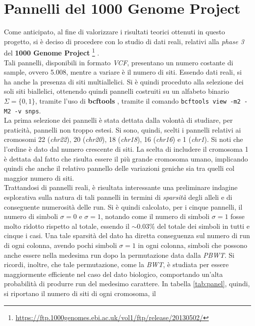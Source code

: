 \section{Pannelli del 1000 Genome Project}
Come anticipato, al fine di valorizzare i risultati teorici ottenuti in
questo progetto, si 
è deciso di procedere con lo studio di dati reali, relativi alla \textit{phase
  3} del \textbf{1000 Genome Project}
\footnote{\url{https://ftp.1000genomes.ebi.ac.uk/vol1/ftp/release/20130502/}}
\cite{1kgp}.\\ 
Tali pannelli, disponibili in formato \textit{VCF}, presentano un numero
costante di sample, ovvero 5.008, mentre a variare è il numero di siti. Essendo
dati reali, si ha anche la presenza di siti multiallelici. Si è quindi proceduto
alla selezione dei soli siti biallelici, ottenendo quindi pannelli costruiti su
un alfabeto binario $\Sigma=\{0,1\}$, tramite l'uso di \textbf{bcftools}
\cite{bcftools}, tramite il comando \texttt{bcftools view -m2 -M2
  -v snps}.\\
La prima selezione dei pannelli è stata dettata dalla volontà di studiare, per
praticità, pannelli non troppo estesi. Si sono,
quindi, scelti i pannelli relativi ai cromosomi 22 (\textit{chr22}), 20
(\textit{chr20}), 18 (\textit{chr18}), 16 (\textit{chr16}) e 1 (\textit{chr1}).
Si noti che  
l'ordine è dato dal numero crescente di siti. La scelta di includere il
cromosoma 1 è dettata dal fatto che risulta essere il più grande cromosoma
umano, implicando quindi che anche il relativo pannello delle variazioni geniche
sia tra quelli col maggior numero di siti.\\
Trattandosi di pannelli reali, è risultata interessante una preliminare
indagine esplorativa sulla natura di tali pannelli in termini di
\textit{sparsità} degli alleli e di conseguente numerosità delle run. Si è
quindi calcolato, per i cinque pannelli, il numero di simboli $\sigma=0$ e
$\sigma=1$, notando come il numero di simboli $\sigma=1$ fosse molto ridotto
rispetto al totale, essendo il $\sim 0.03\%$ del totale dei simboli in tutti e
cinque i casi. Una tale
sparsità del dato ha diretta conseguenza sul numero di run di ogni colonna,
avendo 
pochi simboli $\sigma=1$ in ogni colonna, simboli che possono anche
essere nella medesima run dopo la permutazione data dalla
\textit{PBWT}. Si ricordi, inoltre, che tale permutazione, come la
\textit{BWT}, è studiata per essere 
maggiormente efficiente nel caso del dato biologico, comportando un'alta
probabilità di produrre run del medesimo carattere. In tabella \ref{tab:panel},
  quindi, si riportano il numero di siti di ogni cromosoma, il 
